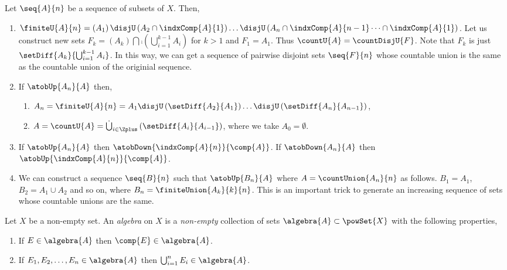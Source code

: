 \begin{Remark}\label{rmk:disjU}
    Let $\seq{A}{n}$ be a sequence of subsets of $X$. Then,
    \begin{enumerate}
	\item $\finiteU{A}{n} = \left(A_1\right) \disjU \left(A_2 \cap \indxComp{A}{1}\right)
	    \dots \disjU \left(A_n\cap\indxComp{A}{n-1}\dots\cap\indxComp{A}{1}\right)$. 
	    Let us construct new sets $F_k = (A_k) \bigcap \comp{(\bigcup_{i = 1}^{k-1}
		A_i)}$ for $k > 1$ and $F_1 = A_1$. Thus $\countU{A} = \countDisjU{F}$. Note that
	    $F_k$ is just $\setDiff{A_k}{\bigcup_{i = 1}^{k-1}A_i}$. In this way,
	    we can get a sequence of pairwise disjoint sets $\seq{F}{n}$ whose countable 
	    union is the same as the countable union of the originial sequence.
	\item If $\atobUp{A_n}{A}$ then, 
	    \begin{enumerate}
		\item $ A_n = \finiteU{A}{n} = A_1 \disjU \left(\setDiff{A_2}{A_1}\right) \dots \disjU
		    \left(\setDiff{A_n}{A_{n-1}}\right)$,
		\item $A = \countU{A} = \dot\bigcup_{i \in \Zplus}\left({\setDiff{A_i}{A_{i-1}}}\right)$, 
		    where we take $A_0 = \emptyset$.
	    \end{enumerate}
	\item If $\atobUp{A_n}{A}$ then $\atobDown{\indxComp{A}{n}}{\comp{A}}$. If
	    $\atobDown{A_n}{A}$ then $\atobUp{\indxComp{A}{n}}{\comp{A}}$.
	\item We can construct a sequence $\seq{B}{n}$ such that $\atobUp{B_n}{A}$ where $A =
	    \countUnion{A_n}{n}$ as follows. $B_1 = A_1$, $B_2 = A_1 \cup A_2$ and so on, where $B_n =
	    \finiteUnion{A_k}{k}{n}$. This is an important trick to generate an increasing sequence of sets
	    whose countable unions are the same.
    \end{enumerate}
\end{Remark}

\begin{Definition}[name=Algebra of sets]
    Let $X$ be a non-empty set. An \emph{algebra} on $X$ is a \emph{non-empty} collection of sets
    $\algebra{A} \subset \powSet{X}$ with the following properties,
    \begin{enumerate}
	\item If $E \in \algebra{A}$ then $\comp{E} \in \algebra{A}$.
	\item If $E_1,E_2,\dots,E_n \in \algebra{A}$ then $\bigcup_{i=1}^{n}E_i \in \algebra{A}$.
    \end{enumerate} 
\end{Definition}


